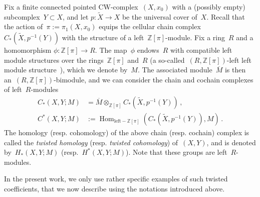 \documentclass{amsart}
\newcommand{\Z}{\mathbb{Z}}
\theoremstyle{definition}
\theoremstyle{remark}
\begin{document}
Fix a finite connected pointed CW-complex~$(X,x_0)$ with a (possibly empty) subcomplex~$Y\subset X$,
and let $p\colon\widetilde{X}\to X$ be the universal cover of~$X$.
Recall that the action of~$\pi:=\pi_1(X,x_0)$ equips the cellular chain complex~$C_*(\widetilde{X},p^{-1}(Y))$ with the
structure of a left~$\Z[\pi]$-module.
Fix a ring~$R$ and a homomorphism $\phi\colon\Z[\pi]\to R$.
The map~$\phi$ endows~$R$ with compatible left module structures over the rings~$\Z[\pi]$ and~$R$ (a so-called~$(R,\Z[\pi])$-left left module structure~\cite{Friedl}), which we denote by~$M$.
The associated module~$\overline{M}$ is then an~$(R,\Z[\pi])$-bimodule, and we can consider the chain and cochain complexes of left~$R$-modules%
\begin{align*}
C_*(X,Y;M)&=\overline{M}\otimes_{\Z[\pi]}C_*(\widetilde{X},p^{-1}(Y))\,,\\
C^*(X,Y;M)&:=\operatorname{Hom}_{\mathrm{left-}\Z[\pi]}(C_*(\widetilde{X},p^{-1}(Y)),M)\,.
\end{align*}
The homology (resp. cohomology) of the above chain (resp. cochain)
complex is called the {\em twisted homology\/} (resp. {\em twisted cohomology\/}) of~$(X,Y)$,
and is denoted by~$H_*(X,Y;M)$ (resp.~$H^*(X,Y;M)$). Note that these groups are left~$R$-modules.

In the present work, we only use rather specific examples of such twisted coefficients, that we now describe using the
notations introduced above.
\end{document}
